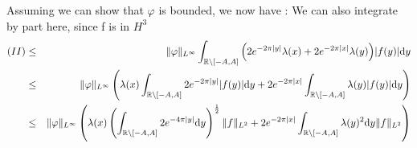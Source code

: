 \documentclass[11pt,a4paper]{article}
\begin{document}
Assuming we can show that $\varphi$ is bounded, we now have :
 We can also integrate by part here, since f is in $H^3$
\begin{eqnarray*}
(II) &\leq& \|\varphi\|_{L^\infty} \int_{\mathbb R \setminus [-A,A]} \Big( 2e^{-2\pi|y|}\lambda(x)+2e^{-2\pi|x|}\lambda(y)\Big)|f(y)|\mathrm{d}y \\
&\leq&  \|\varphi\|_{L^\infty} \left( \lambda(x) \int_{\mathbb R \setminus [-A,A]} 2e^{-2\pi|y|}|f(y)|\mathrm{d}y +   2e^{-2\pi|x|}\int_{\mathbb R \setminus [-A,A]} \lambda(y)|f(y)|\mathrm{d}y\right)\\
&\leq&  \|\varphi\|_{L^\infty} \left( \lambda(x) \left(\int_{\mathbb R \setminus [-A,A]} 2e^{-4\pi|y|}\mathrm{d}y\right)^\frac{1}{2} \|f\|_{L^2} +   2e^{-2\pi|x|}\int_{\mathbb R \setminus [-A,A]} \lambda(y)^2\mathrm{d}y\|f\|_{L^2}\right)\\
\end{eqnarray*}
\end{document}
